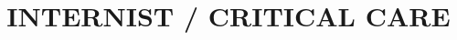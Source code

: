 \documentclass[11pt,letter]{moderncv}
\title{INTERNIST / CRITICAL CARE}               %
\begin{document}
\maketitle
%

\closesection
\emptysection
\newpage


\end{document}
